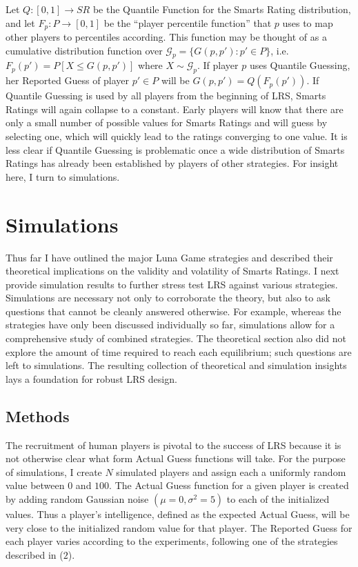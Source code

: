 Let $Q : [0, 1] \to SR$ be the Quantile Function for the Smarts Rating distribution, and let $F_p : P \to [0, 1]$ be the ``player percentile function'' that $p$ uses to map other players to percentiles according. This function may be thought of as a cumulative distribution function over $\mathcal{G}_p = \{G(p, p') : p' \in P\}$, i.e. $F_p(p') = P[X \le G(p, p')]$ where $X \sim \mathcal{G}_p$. If player $p$ uses Quantile Guessing, her Reported Guess of player $p' \in P$ will be $G(p, p') = Q(F_p(p'))$. If Quantile Guessing is used by all players from the beginning of LRS, Smarts Ratings will again collapse to a constant. Early players will know that there are only a small number of possible values for Smarts Ratings and will guess by selecting one, which will quickly lead to the ratings converging to one value. It is less clear if Quantile Guessing is problematic once a wide distribution of Smarts Ratings has already been established by players of other strategies. For insight here, I turn to simulations.

\section{Simulations}

Thus far I have outlined the major Luna Game strategies and described their theoretical implications on the validity and volatility of Smarts Ratings. I next provide simulation results to further stress test LRS against various strategies. Simulations are necessary not only to corroborate the theory, but also to ask questions that cannot be cleanly answered otherwise. For example, whereas the strategies have only been discussed individually so far, simulations allow for a comprehensive study of combined strategies. The theoretical section also did not explore the amount of time required to reach each equilibrium; such questions are left to simulations. The resulting collection of theoretical and simulation insights lays a foundation for robust LRS design.

\subsection{Methods}

The recruitment of human players is pivotal to the success of LRS because it is not otherwise clear what form Actual Guess functions will take. For the purpose of simulations, I create $N$ simulated players and assign each a uniformly random value between $0$ and $100$. The Actual Guess function for a given player is created by adding random Gaussian noise $(\mu = 0, \sigma^2 = 5)$ to each of the initialized values. Thus a player's intelligence, defined as the expected Actual Guess, will be very close to the initialized random value for that player. The Reported Guess for each player varies according to the experiments, following one of the strategies described in ($2$). 

